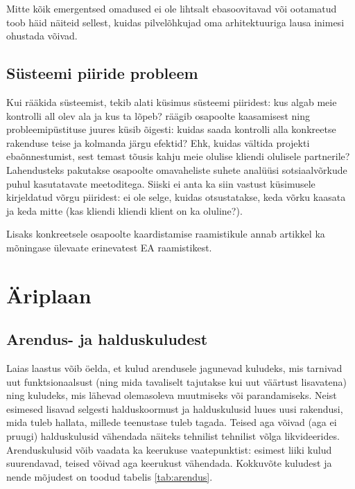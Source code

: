 \documentclass{article}
\begin{document}
Mitte kõik emergentsed omadused ei ole lihtsalt ebasoovitavad või ootamatud \cite{emergence} toob häid näiteid sellest, kuidas pilvelõhkujad oma arhitektuuriga lausa inimesi ohustada võivad.

\subsection{Süsteemi piiride probleem}
\label{sec:boundary}
Kui rääkida süsteemist, tekib alati küsimus süsteemi piiridest: kus algab meie kontrolli all olev ala ja kus ta lõpeb? \cite{wood2013framework} räägib osapoolte kaasamisest ning probleemipüstituse juures küsib õigesti: kuidas saada kontrolli alla konkreetse rakenduse teise ja kolmanda järgu efektid? Ehk, kuidas vältida projekti ebaõnnestumist, sest temast tõusis kahju meie olulise kliendi olulisele partnerile? Lahendusteks pakutakse osapoolte omavaheliste suhete analüüsi sotsiaalvõrkude puhul kasutatavate meetoditega. Siiski ei anta ka siin vastust küsimusele kirjeldatud võrgu piiridest: ei ole selge, kuidas otsustatakse, keda võrku kaasata ja keda mitte (kas kliendi kliendi klient on ka oluline?). 

Lisaks konkreetsele osapoolte kaardistamise raamistikule annab artikkel ka mõningase ülevaate erinevatest EA raamistikest.

\section{Äriplaan}
\subsection{Arendus- ja halduskuludest}
\label{sec:kulud}
Laias laastus võib öelda, et kulud arendusele jagunevad kuludeks, mis tarnivad uut funktsionaalsust (ning mida tavaliselt tajutakse kui uut väärtust lisavatena) ning kuludeks, mis lähevad olemasoleva muutmiseks või parandamiseks. Neist esimesed lisavad selgesti halduskoormust ja halduskulusid luues uusi rakendusi, mida tuleb hallata, millede teenustase tuleb tagada. Teised aga võivad (aga ei pruugi) halduskulusid vähendada näiteks tehnilist tehnilist võlga likvideerides. Arenduskulusid võib vaadata ka keerukuse vaatepunktist: esimest liiki kulud suurendavad, teised võivad aga keerukust vähendada. Kokkuvõte kuludest ja nende mõjudest on toodud tabelis \ref{tab:arendus}.
\end{document}
